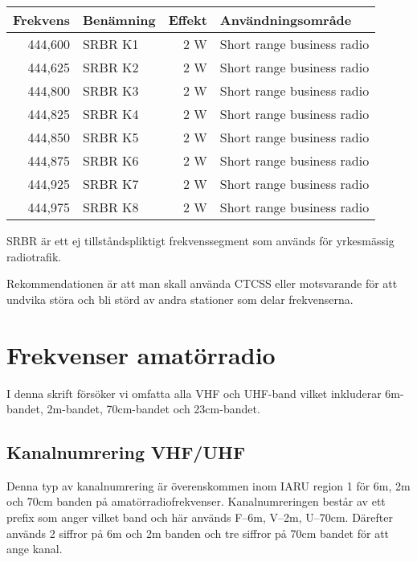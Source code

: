\begin{longtable}{rlrl}
	\textbf{Frekvens} & \textbf{Benämning} & \textbf{Effekt} & \textbf{Användningsområde} \\ \hline \endhead
	          444,600 & SRBR K1            & 2 W             & Short range business radio \\
	          444,625 & SRBR K2            & 2 W             & Short range business radio \\
	          444,800 & SRBR K3            & 2 W             & Short range business radio \\
	          444,825 & SRBR K4            & 2 W             & Short range business radio \\
	          444,850 & SRBR K5            & 2 W             & Short range business radio \\
	          444,875 & SRBR K6            & 2 W             & Short range business radio \\
	          444,925 & SRBR K7            & 2 W             & Short range business radio \\
	          444,975 & SRBR K8            & 2 W             & Short range business radio
\end{longtable}

SRBR är ett ej tillståndspliktigt frekvenssegment som används för
yrkesmässig radiotrafik.

Rekommendationen är att man skall använda CTCSS eller motsvarande för
att undvika störa och bli störd av andra stationer som delar
frekvenserna.


\section{Frekvenser amatörradio}

I denna skrift försöker vi omfatta alla VHF och UHF-band vilket
inkluderar 6m-bandet, 2m-bandet, 70cm-bandet och 23cm-bandet.

\subsection{Kanalnumrering VHF/UHF}

Denna typ av kanalnumrering är överenskommen inom IARU region 1 för
6m, 2m och 70cm banden på amatörradiofrekvenser. Kanalnumreringen
består av ett prefix som anger vilket band och här används F--6m,
V--2m, U--70cm. Därefter används 2 siffror på 6m och 2m banden och tre
siffror på 70cm bandet för att ange kanal.

